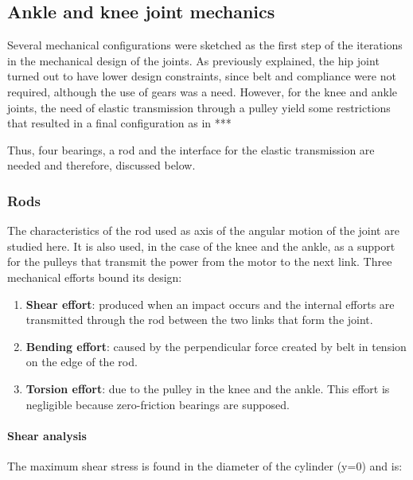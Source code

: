 
\subsection{Ankle and knee joint mechanics} %
\label{sub:hip_and_knee_joint_mechanics}
Several mechanical configurations were sketched as the first step of the iterations in the mechanical design of the joints.
As previously explained, the hip joint turned out to have lower design constraints, since belt and compliance were not required, although the use of gears was a need.
However, for the knee and ankle joints, the need of elastic transmission through a pulley yield some restrictions that resulted in a final configuration as in *** %

Thus, four bearings, a rod and the interface for the elastic transmission are needed and therefore, discussed below.

\subsubsection{Rods} %
\label{ssub:rods}
The characteristics of the rod used as axis of the angular motion of the joint are studied here.
It is also used, in the case of the knee and the ankle, as a support for the pulleys that transmit the power from the motor to the next link.
Three mechanical efforts bound its design:
\begin{enumerate}
  \item \textbf{Shear effort}: produced when an impact occurs and the internal efforts are transmitted through the rod between the two links that form the joint.
  \item \textbf{Bending effort}: caused by the perpendicular force created by belt in tension on the edge of the rod.
  \item \textbf{Torsion effort}: due to the pulley in the knee and the ankle. 
  This effort is negligible because zero-friction bearings are supposed.
\end{enumerate}

  \paragraph{Shear analysis} %
  \label{ssub:shear_analysis}
  The maximum shear stress is found in the diameter of the cylinder (y=0) and is:
  
